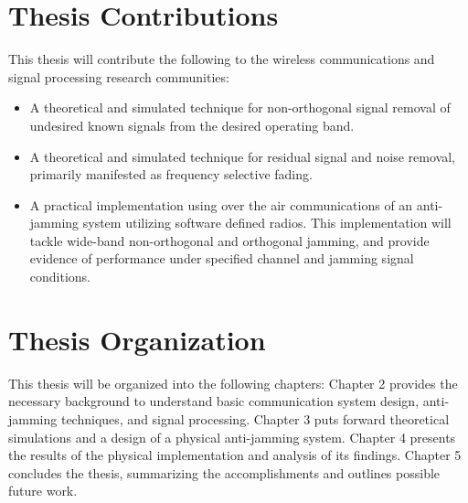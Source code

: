 \section{Thesis Contributions}

This thesis will contribute the following to the wireless communications and signal processing research communities:

\begin{itemize}
\item A theoretical and simulated technique for non-orthogonal signal removal of undesired known signals from the desired operating band.

\item A theoretical and simulated technique for residual signal and noise removal, primarily manifested as frequency selective fading.

\item A practical implementation using over the air communications of an anti-jamming system utilizing software defined radios. This implementation will tackle wide-band non-orthogonal and orthogonal jamming, and provide evidence of performance under specified channel and jamming signal conditions.

\end{itemize}


\section{Thesis Organization}

This thesis will be organized into the following chapters:  Chapter 2 provides the necessary background to understand basic communication system design, anti-jamming techniques, and signal processing.  Chapter 3 puts forward theoretical simulations and a design of a physical anti-jamming system.  Chapter 4 presents the results of the physical implementation and analysis of its findings.  Chapter 5 concludes the thesis, summarizing the accomplishments and outlines possible future work.
